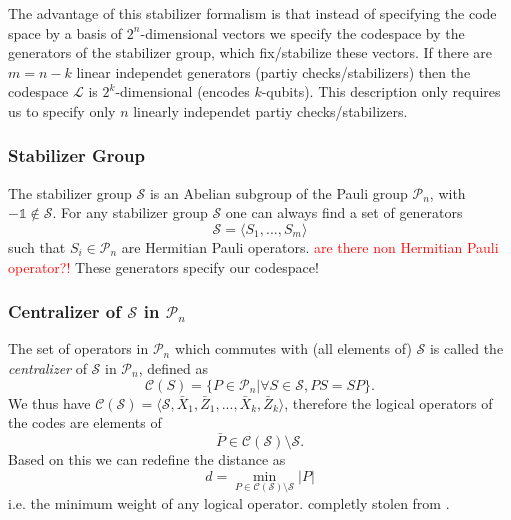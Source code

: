The advantage of this stabilizer formalism is that instead of specifying the code space by a basis of $2^n$-dimensional vectors we specify the codespace by the generators of the stabilizer group, which fix/stabilize these vectors. 
If there are $m=n-k$ linear independet generators (partiy checks/stabilizers) then the codespace $\mathcal{L}$ is $2^k$-dimensional (encodes $k$-qubits).
This description only requires us to specify only $n$ linearly independet partiy checks/stabilizers. \cite{QECmemory}


\subsubsection{Stabilizer Group}
The stabilizer group $\mathcal{S}$ is an Abelian subgroup of the Pauli group $\mathcal{P}_n$, with $-\mathds{1} \notin \mathcal{S}$.
For any stabilizer group $\mathcal{S}$ one can always find a set of generators
\begin{equation}
    \mathcal{S} = \langle S_1, ..., S_m \rangle
\end{equation}
such that $S_i\in \mathcal{P}_n$ are Hermitian Pauli operators. \textcolor{red}{are there non Hermitian Pauli operator?!} 
These generators specify our codespace! \cite{QECmemory}


\subsubsection{Centralizer of $\mathcal{S}$ in $\mathcal{P}_n$}
The set of operators in $\mathcal{P}_n$ which commutes with (all elements of) $\mathcal{S}$ is called the \textit{centralizer} of $\mathcal{S}$ in $\mathcal{P}_n$, defined as 
\begin{equation}
    \mathcal{C}(S) = \{ P \in \mathcal{P}_n | \forall S \in \mathcal{S}, PS = SP\}.
\end{equation}
We thus have $\mathcal{C}(\mathcal{S}) = \langle \mathcal{S}, \bar{X}_1, \bar{Z}_1, ..., \bar{X}_k, \bar{Z}_k\rangle$, 
therefore the logical operators of the codes are elements of 
\begin{equation}
    \bar{P} \in \mathcal{C}(\mathcal{S})\setminus \mathcal{S}.
\end{equation}
Based on this we can redefine the distance as
\begin{equation}
    d = \min_{P \in \mathcal{C}(\mathcal{S})\setminus\mathcal{S}} |P|
\end{equation}
i.e. the minimum weight of any logical operator.
completly stolen from \cite{QECmemory}.


